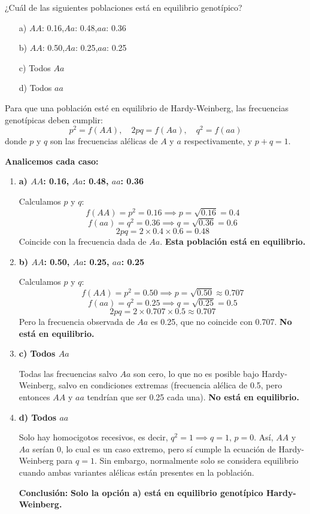 \documentclass{article}
\begin{document}
¿Cuál de las siguientes poblaciones está en equilibrio genotípico?

\begin{itemize}
    \item[a)] $AA$: 0.16,\quad $Aa$: 0.48,\quad $aa$: 0.36
    \item[b)] $AA$: 0.50,\quad $Aa$: 0.25,\quad $aa$: 0.25
    \item[c)] Todos $Aa$
    \item[d)] Todos $aa$
\end{itemize}

Para que una población esté en equilibrio de Hardy-Weinberg, las frecuencias genotípicas deben cumplir:
\[
p^2 = f(AA), \quad 2pq = f(Aa), \quad q^2 = f(aa)
\]
donde $p$ y $q$ son las frecuencias alélicas de $A$ y $a$ respectivamente, y $p + q = 1$.

\textbf{Analicemos cada caso:}

\begin{enumerate}[label=\alph*)]
    \item \textbf{a) $AA$: 0.16, $Aa$: 0.48, $aa$: 0.36}

    Calculamos $p$ y $q$:
    \[
    f(AA) = p^2 = 0.16 \implies p = \sqrt{0.16} = 0.4
    \]
    \[
    f(aa) = q^2 = 0.36 \implies q = \sqrt{0.36} = 0.6
    \]
    \[
    2pq = 2 \times 0.4 \times 0.6 = 0.48
    \]
    Coincide con la frecuencia dada de $Aa$. \textbf{Esta población está en equilibrio.}

    \item \textbf{b) $AA$: 0.50, $Aa$: 0.25, $aa$: 0.25}

    Calculamos $p$ y $q$:
    \[
    f(AA) = p^2 = 0.50 \implies p = \sqrt{0.50} \approx 0.707
    \]
    \[
    f(aa) = q^2 = 0.25 \implies q = \sqrt{0.25} = 0.5
    \]
    \[
    2pq = 2 \times 0.707 \times 0.5 \approx 0.707
    \]
    Pero la frecuencia observada de $Aa$ es 0.25, que no coincide con 0.707. \textbf{No está en equilibrio.}

    \item \textbf{c) Todos $Aa$}

    Todas las frecuencias salvo $Aa$ son cero, lo que no es posible bajo Hardy-Weinberg, salvo en condiciones extremas (frecuencia alélica de 0.5, pero entonces $AA$ y $aa$ tendrían que ser 0.25 cada una). \textbf{No está en equilibrio.}

    \item \textbf{d) Todos $aa$}

    Solo hay homocigotos recesivos, es decir, $q^2 = 1 \implies q = 1$, $p = 0$. Así, $AA$ y $Aa$ serían 0, lo cual es un caso extremo, pero sí cumple la ecuación de Hardy-Weinberg para $q = 1$. Sin embargo, normalmente solo se considera equilibrio cuando ambas variantes alélicas están presentes en la población.

    \textbf{Conclusión:} \textbf{Solo la opción a) está en equilibrio genotípico Hardy-Weinberg.}
\end{enumerate}
\end{document}
